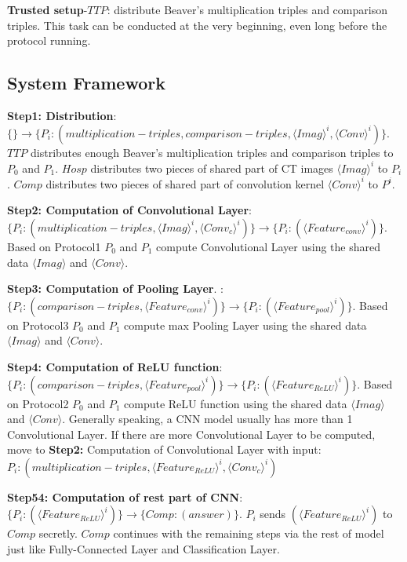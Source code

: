 \documentclass[11pt,twoside,a4paper]{article}
\begin{document}
\textbf{Trusted setup}-$TTP$: distribute Beaver’s multiplication triples and comparison triples. 
This task can be conducted at the very beginning, even long before the protocol running.

\subsection{System Framework}
\textbf{Step1: Distribution}:$\{\}\rightarrow \{P_{i}:(multiplication-triples, comparison-triples, \langle Imag\rangle ^{i}, \langle Conv\rangle ^{i})\}$.
$TTP$ distributes enough Beaver’s multiplication triples and comparison triples to $P_{0}$ and $P_{1}$. 
$Hosp$ distributes two pieces of shared part of CT images $\langle Imag\rangle ^{i}$ to $P_{i}$. 
$Comp$ distributes two pieces of shared part of convolution kernel $\langle Conv\rangle ^{i}$ to $P^{i}$.

\textbf{Step2: Computation of Convolutional Layer}:$\{P_{i}:(multiplication-triples, \langle Imag\rangle ^{i}, \langle Conv_{c}\rangle ^{i})\}\rightarrow \{P_{i}:(\langle Feature_{conv}\rangle ^{i})\}$. 
Based on Protocol1 $P_{0}$ and $P_{1}$ compute Convolutional Layer using the shared data $\langle Imag\rangle $ and $\langle Conv\rangle $. 

\textbf{Step3: Computation of Pooling Layer}. :$\{P_{i}:(comparison-triples, \langle Feature_{conv}\rangle ^{i})\}\rightarrow \{P_{i}:(\langle Feature_{pool}\rangle ^{i})\}$. 
Based on Protocol3 $P_{0}$ and $P_{1}$ compute max Pooling Layer using the shared data $\langle Imag\rangle $ and $\langle Conv\rangle $.

\textbf{Step4: Computation of ReLU function}: $\{P_{i}:(comparison-triples, \langle Feature_{pool}\rangle ^{i})\}\rightarrow \{P_{i}:(\langle Feature_{ReLU}\rangle ^{i})\}$.
Based on Protocol2 $P_{0}$ and $P_{1}$ compute ReLU function using the shared data $\langle Imag\rangle $ and $\langle Conv\rangle $. Generally speaking, a CNN 
model usually has more than 1 Convolutional Layer. If there are more Convolutional Layer to be computed, 
move to \textbf{Step2:} Computation of Convolutional Layer with input:$P_{i}:(multiplication-triples, \langle Feature_{ReLU}\rangle ^{i}, \langle Conv_{c}\rangle ^{i})$

\textbf{Step54: Computation of rest part of CNN}: $\{P_{i}:(\langle Feature_{ReLU}\rangle ^{i})\}\rightarrow \{Comp:(answer)\}$. 
$P_{i}$ sends $(\langle Feature_{ReLU}\rangle ^{i})$ to $Comp$ secretly. $Comp$ continues with the remaining steps via the rest of model 
just like Fully-Connected Layer and Classification Layer.
 
\end{document}
